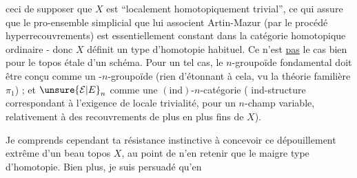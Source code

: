 ceci de supposer que $X$ est ``localement homotopiquement trivial'', ce qui assure que le pro-ensemble simplicial que lui associent Artin-Mazur (par le procédé  hyperrecouvrements) est essentiellement constant dans la catégorie homotopique ordinaire - donc $X$ définit un type d'homotopie habituel. Ce n'est \uline{pas} le cas bien  pour le topos étale d'un schéma. Pour un tel cas, le $n$-groupoïde fondamental doit être conçu comme un -$n$-groupoïde (rien d'étonnant à cela, vu la théorie familière  $\pi_1$) ; et $\unsure{\mathcal E|E}_n$ comme une $(\mathrm{ind})$-$n$-catégorie ( ind-structure correspondant à l'exigence de locale trivialité, pour un $n$-champ variable, relativement à des recouvrements de plus en plus fins de $X$).


Je comprends cependant ta résistance instinctive à concevoir ce dépouillement extrême d'un beau topos $X$, au point de n'en retenir que le maigre type d'homotopie. Bien plus, je suis persuadé qu'en
